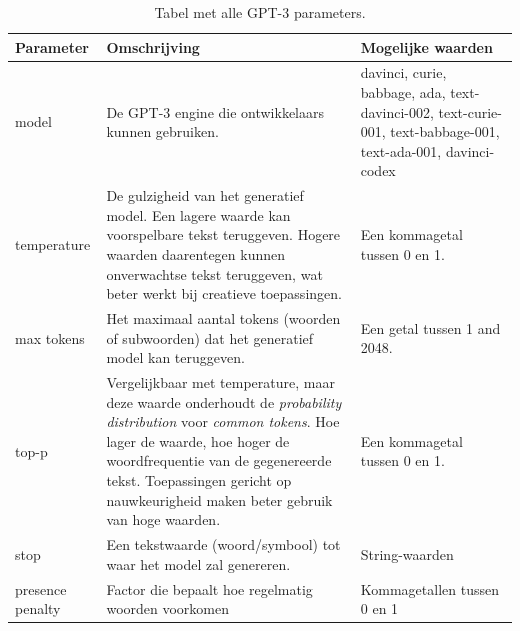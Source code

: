 \medspace

\begin{center}
	\begin{table}[H]
	\begin{tabular}{ m{3cm} | m{7cm} | m{5cm} }
		\hline
		\textbf{Parameter} & \textbf{Omschrijving} & \textbf{Mogelijke waarden} \\
		\hline
		model & De GPT-3 engine die ontwikkelaars kunnen gebruiken. & davinci, curie, babbage, ada, text-davinci-002, text-curie-001, text-babbage-001, text-ada-001, davinci-codex \\
		\hline
		temperature & De gulzigheid van het generatief model. Een lagere waarde kan voorspelbare tekst teruggeven. Hogere waarden daarentegen kunnen onverwachtse tekst teruggeven, wat beter werkt bij creatieve toepassingen. & Een kommagetal tussen 0 en 1. \\
		\hline
		max tokens & Het maximaal aantal tokens (woorden of subwoorden) dat het generatief model kan teruggeven. & Een getal tussen 1 and 2048. \\
		\hline
		top-p & Vergelijkbaar met temperature, maar deze waarde onderhoudt de \textit{probability distribution} voor \textit{common tokens}. Hoe lager de waarde, hoe hoger de woordfrequentie van de gegenereerde tekst. Toepassingen gericht op nauwkeurigheid maken beter gebruik van hoge waarden. & Een kommagetal tussen 0 en 1. \\
		\hline
		stop & Een tekstwaarde (woord/symbool) tot waar het model zal genereren. & String-waarden \\
		\hline
		presence penalty & Factor die bepaalt hoe regelmatig woorden voorkomen & Kommagetallen tussen 0 en 1 \\
		\hline
	\end{tabular}
		\caption{Tabel met alle GPT-3 parameters.}
		\label{table:gpt-3-parameters}
	\end{table}
\end{center}

